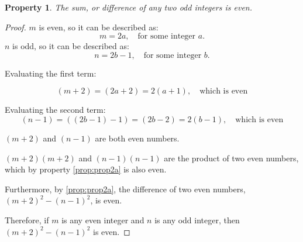 \documentclass[11pt, letterpaper, includehead]{article}
\theoremstyle{plain}
\theoremstyle{mydefinition}
\theoremstyle{myproperty}
\newtheorem{prop}{Property}
\begin{document}
\begin{enumerate}[label=\textbf{\arabic*}., leftmargin=*]
\begin{prop}\label{prop:prop2b}
    The sum, or difference of any two odd integers is even.
\end{prop}
\begin{proof} 
    $m$ is even, so it can be described as:
    \[ m = 2a, \quad \text{for some integer } a.\]
    $n$ is odd, so it can be described as:
    \[n = 2b - 1, \quad \text{for some integer } b.\]

    Evaluating the first term:

    \[(m + 2) = (2a + 2) = 2(a + 1), \quad \text{which is even}\]

    Evaluating the second term:
    \[(n - 1) = ((2b - 1) - 1) = (2b - 2) = 2(b - 1), \quad \text{which is even}\]

    $(m + 2)$ and $(n - 1)$ are both even numbers.
    
    $(m + 2)(m + 2)$ and $(n - 1)(n - 1)$ are the product of two even numbers, which by property \ref{prop:prop2a} is also even.

    Furthermore, by \ref{prop:prop2a}, the difference of two even numbers, $(m + 2)^2 - (n - 1)^2$, is even.

    Therefore, if $m$ is any even integer and $n$ is any odd integer, then $(m + 2)^2 - (n - 1)^2$ is even.
\end{proof}


\end{enumerate}
\end{document}

